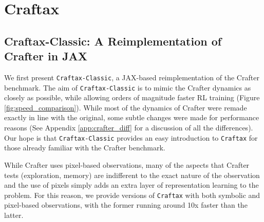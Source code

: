 \documentclass{article}
\theoremstyle{plain}
\theoremstyle{definition}
\theoremstyle{remark}
\begin{document}




\section{Craftax}
\subsection{Craftax-Classic: A Reimplementation of Crafter in JAX} \label{sec:craftax_classic}

We first present \texttt{Craftax-Classic}, a JAX-based reimplementation of the Crafter benchmark.  The aim of \texttt{Craftax-Classic} is to mimic the Crafter dynamics as closely as possible, while allowing orders of magnitude faster RL training (Figure \ref{fig:speed_comparison}).  While most of the dynamics of Crafter were remade exactly in line with the original, some subtle changes were made for performance reasons (See Appendix \ref{app:crafter_diff} for a discussion of all the differences).  Our hope is that \texttt{Craftax-Classic} provides an easy introduction to \texttt{Craftax} for those already familiar with the Crafter benchmark.


While Crafter uses pixel-based observations, many of the aspects that Crafter tests (exploration, memory) are indifferent to the exact nature of the observation and the use of pixels simply adds an extra layer of representation learning to the problem.  For this reason, we provide versions of \texttt{Craftax} with both symbolic and pixel-based observations, with the former running around 10x faster than the latter.
\end{document}
